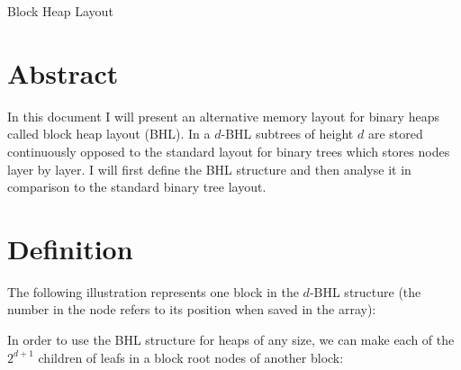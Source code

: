 \documentclass[10pt, a4paper]{article}
\begin{document}
\begin{center}
\LARGE Block Heap Layout
\end{center}

\section{Abstract}

In this document I will present an alternative memory layout for binary heaps called block heap layout (BHL).
In a $d$-BHL subtrees of height $d$ are stored continuously opposed to the standard layout for binary trees which stores nodes layer by layer.
I will first define the BHL structure and then analyse it in comparison to the standard binary tree layout.

\section{Definition}

The following illustration represents one block in the $d$-BHL structure (the number in the node refers to its position when saved in the array):


In order to use the BHL structure for heaps of any size, we can make each of the $2^{d+1}$ children of leafs in a block root nodes of another block:

\end{document}

